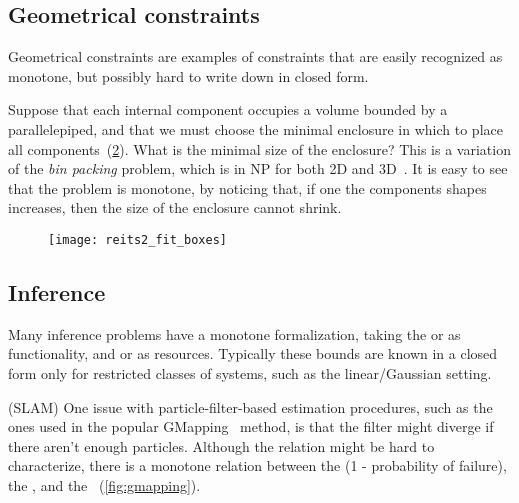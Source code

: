\begin{figure}[h]
    \centering
    \caption{\label{fig:crack}}
\end{figure}

\subsection{Geometrical constraints}

Geometrical constraints are examples of constraints that are easily
recognized as monotone, but possibly hard to write down in closed
form.

\begin{example}
    Suppose that each internal component occupies a volume
    bounded by a parallelepiped, and that we must choose the minimal enclosure
    in which to place all components~(\cref{fig:packing}). What
    is the minimal size of the enclosure? This is a variation of the \emph{bin
    packing} problem, which is in NP for both 2D and 3D~\cite{lodi02two}.
    It is easy to see that the problem is monotone, by noticing that,
    if one the components shapes increases, then the size of the enclosure
    cannot shrink.
\end{example}

\begin{figure}[h]
    \centering
    \texttt{[image: reits2\_fit\_boxes]}
    \caption{\label{fig:packing}}
\end{figure}

\subsection{Inference}

Many inference problems have a monotone formalization, taking the
 or  as functionality, and 
or  as resources. Typically these bounds are known in
a closed form only for restricted classes of systems, such as the
linear/Gaussian setting.

\begin{example}
(SLAM)
    One issue with particle-filter-based estimation procedures,
    such as the ones used in the popular GMapping~\cite{grisetti07improved}
    method, is that the filter might diverge if there aren't enough particles.
    Although the relation might be hard to characterize, there is a monotone
    relation between the  (1 - probability of failure),
    the , and the ~(\cref{fig:gmapping}).
\end{example}

